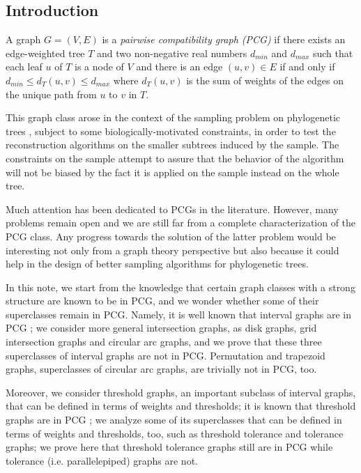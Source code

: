 \documentclass{elsarticle}
\begin{document}
\begin{doublespace}

\section{Introduction}\label{sec:intro}

A graph $G=(V,E)$ is a {\em pairwise compatibility graph (PCG)}  if there exists an edge-weighted tree $T$ and two non-negative real numbers $d_{min}$ and $d_{max}$ such that each leaf $u$ of $T$ is a node of $V$ and there is an edge $(u,v) \in E$ if and only if $d_{min} \leq d_T (u, v) \leq d_{max}$ where $d_T (u, v)$ is the sum of weights of the edges on the unique path from $u$ to $v$ in $T$. 

This graph class arose in the context of the sampling problem on phylogenetic trees  \cite{Kal03}, subject to some biologically-motivated constraints, in order to test the reconstruction algorithms on the smaller subtrees induced by the sample. The constraints on the sample attempt to assure that the behavior of the algorithm will not be biased by the fact it is applied on the sample instead on the whole tree. 

Much attention has been dedicated to PCGs in the literature. However, many problems remain open and we are still far from a complete characterization of the PCG class.
Any progress towards the solution of the latter problem would be interesting not only from a graph theory perspective but also because it could help in the design of better sampling algorithms for phylogenetic trees.

In this note, we start from the knowledge that certain graph classes with a strong structure are known to be in PCG, and we wonder whether some of their superclasses remain in PCG.
Namely, it is well known that interval graphs are in PCG \cite{BH08}; we consider more general intersection graphs, as disk graphs, grid intersection graphs and circular arc graphs, and we prove that these three superclasses of interval graphs are not in PCG.
Permutation and trapezoid graphs, superclasses of circular arc graphs, are trivially not in PCG, too.

Moreover, we consider threshold graphs, an important subclass of interval graphs, that can be defined in terms of weights and thresholds; it is known that threshold graphs are in PCG  \cite{CPS11}; we analyze some of its superclasses that can be defined in terms of weights and thresholds, too, such as threshold tolerance and tolerance graphs; we prove here that threshold tolerance graphs still are in PCG while tolerance (i.e. parallelepiped) graphs are not.


\end{doublespace}
\end{document}
